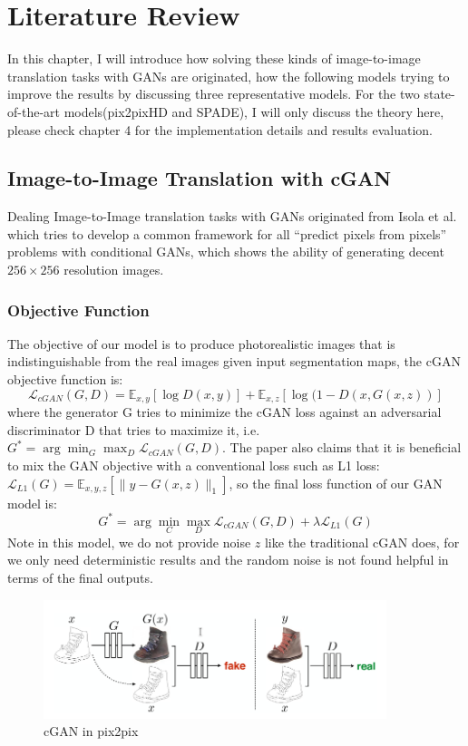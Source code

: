 \chapter{Literature Review}
\label{cha:review}
In this chapter, I will introduce how solving these kinds of image-to-image
translation tasks with GANs are originated, how the following models trying 
to improve the results by discussing three representative models.
For the two state-of-the-art models(pix2pixHD and SPADE), I will only discuss
the theory here, please check chapter 4 for the implementation details and
results evaluation.

\section{Image-to-Image Translation with cGAN}
Dealing Image-to-Image translation tasks with GANs originated from Isola et al.\cite{pix2pix2016}
which tries to develop a common framework for all “predict pixels from pixels” problems with 
conditional GANs, which shows the ability of generating decent $256 \times 256$ resolution images. 

\subsection{Objective Function}
The objective of our model is to produce photorealistic images that is indistinguishable from the 
real images given input segmentation maps, the cGAN objective function is:
$$\mathcal{L}_{c G A N}(G, D)=\mathbb{E}_{x, y}[\log D(x, y)]+\mathbb{E}_{x, z}[\log (1-D(x, G(x, z))]$$
where the generator G tries to minimize the cGAN loss against an adversarial discriminator D that 
tries to maximize it, i.e. $G^{*}=\arg \min _{G} \max _{D} \mathcal{L}_{c G A N}(G, D)$.
The paper also claims that it is beneficial to mix the GAN objective with a conventional loss 
such as L1 loss: $\mathcal{L}_{L 1}(G)=\mathbb{E}_{x, y, z}\left[\|y-G(x, z)\|_{1}\right]$, so the 
final loss function of our GAN model is:
$$G^{*}=\arg \min _{C} \max _{D} \mathcal{L}_{c G A N}(G, D)+\lambda \mathcal{L}_{L 1}(G)$$
Note in this model, we do not provide noise $z$ like the traditional cGAN does, for we only need 
deterministic results and the random noise is not found helpful in terms of the final outputs.
\begin{figure}[H]
    \begin{center}
    \includegraphics[width=10cm]{figures/pix2pix-cGAN}
    \end{center}
    \caption{cGAN in pix2pix}
    \label{fig:pix2pix-cGAN}
\end{figure}

